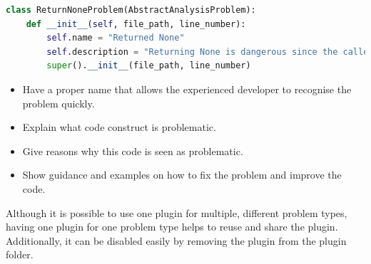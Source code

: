 \begin{minipage}[c]{0.95\linewidth}

\begin{lstlisting}[language=Python, label=lst:return_none_problem_override, caption={Example for overwriting the \textit{AbstractAnalysisProblem} with a concete implmentation. The problem name and description are overwritten.}]
class ReturnNoneProblem(AbstractAnalysisProblem):
    def __init__(self, file_path, line_number):
        self.name = "Returned None"
        self.description = "Returning None is dangerous since the caller has to check for None. Otherwise, a runtime exception may occur."
        super().__init__(file_path, line_number)
\end{lstlisting}
\end{minipage}

\begin{itemize}
    \item Have a proper name that allows the experienced developer to recognise the problem quickly.
    \item Explain what code construct is problematic.
    \item Give reasons why this code is seen as problematic.
    \item Show guidance and examples on how to fix the problem and improve the code.
\end{itemize}
Although it is possible to use one plugin for multiple, different problem types, having one plugin for one problem type helps to reuse and share the plugin. Additionally, it can be disabled easily by removing the plugin from the plugin folder.

